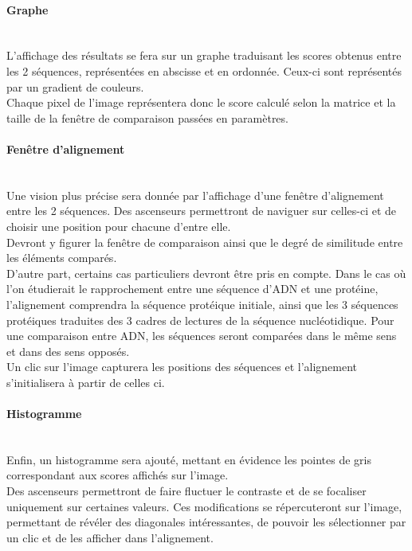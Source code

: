 \documentclass{report}
\begin{document}
\paragraph{Graphe} ~\\
	L'affichage des résultats se fera sur un graphe traduisant les scores obtenus entre les 2 séquences, représentées en abscisse et en ordonnée. Ceux-ci sont représentés par un gradient de couleurs.\\
Chaque pixel de l'image représentera donc le score calculé selon la matrice et la taille de la fenêtre de comparaison passées en paramètres.

\paragraph{Fenêtre d'alignement} ~\\
	Une vision plus précise sera donnée par l'affichage d'une fenêtre d'alignement entre les 2 séquences.
Des ascenseurs permettront de naviguer sur celles-ci et de choisir une position pour chacune d'entre elle.\\
Devront y figurer la fenêtre de comparaison ainsi que le degré de similitude entre les éléments comparés.\\
D'autre part, certains cas particuliers devront être pris en compte.
Dans le cas où l'on étudierait le rapprochement entre une séquence d'ADN et une protéine, l'alignement comprendra la séquence protéique initiale, ainsi que les 3 séquences protéiques traduites des 3 cadres de lectures de la séquence nucléotidique.
Pour une comparaison entre ADN, les séquences seront comparées dans le même sens et dans des sens opposés.\\
Un clic sur l'image capturera les positions des séquences et l'alignement s'initialisera à partir de celles ci.

\paragraph{Histogramme} ~\\

Enfin, un histogramme sera ajouté, mettant en évidence les pointes de gris correspondant aux scores affichés sur l'image.\\
Des ascenseurs permettront de faire fluctuer le contraste et de se focaliser uniquement sur certaines valeurs. Ces modifications  se répercuteront sur l'image, permettant de révéler des diagonales intéressantes, de pouvoir les sélectionner par un clic et de les afficher dans l'alignement.
\end{document}
